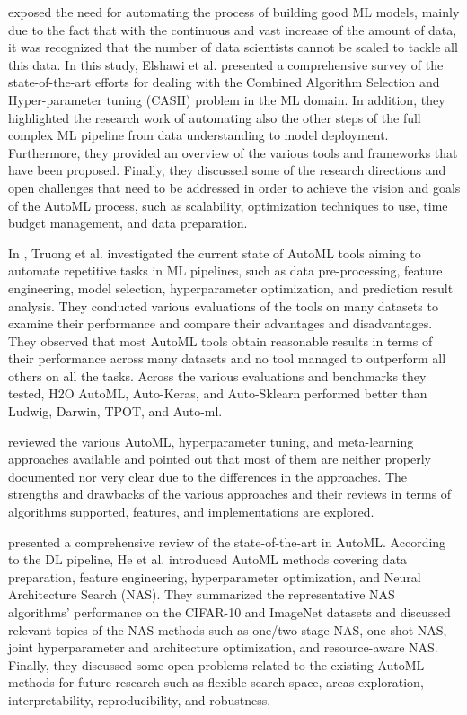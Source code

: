 \cite{Elshawi2019} exposed the need for automating the process of building good ML models, mainly due to the fact that with the continuous and vast increase of the amount of data, it was recognized that the number of data scientists cannot be scaled to tackle all this data.
In this study, Elshawi et al. presented a comprehensive survey of the state-of-the-art efforts for dealing with the Combined Algorithm Selection and Hyper-parameter tuning (CASH) problem in the ML domain.
In addition, they highlighted the research work of automating also the other steps of the full complex ML pipeline from data understanding to model deployment.
Furthermore, they provided an overview of the various tools and frameworks that have been proposed.
Finally, they discussed some of the research directions and open challenges that need to be addressed in order to achieve the vision and goals of the AutoML process, such as scalability, optimization techniques to use, time budget management, and data preparation.

In \cite{8995391}, Truong et al. investigated the current state of AutoML tools aiming to automate repetitive tasks in ML pipelines, such as data pre-processing, feature engineering, model selection, hyperparameter optimization, and prediction result analysis.
They conducted various evaluations of the tools on many datasets to examine their performance and compare their advantages and disadvantages.
They observed that most AutoML tools obtain reasonable results in terms of their performance across many datasets and no tool managed to outperform all others on all the tasks.
Across the various evaluations and benchmarks they tested, H2O AutoML, Auto-Keras, and Auto-Sklearn performed better than Ludwig, Darwin, TPOT, and Auto-ml.

\cite{9033810} reviewed the various AutoML, hyperparameter tuning, and meta-learning approaches available and pointed out that most of them are neither properly documented nor very clear due to the differences in the approaches.
The strengths and drawbacks of the various approaches and their reviews in terms of algorithms supported, features, and implementations are explored.

\cite{HE2021106622} presented a comprehensive review of the state-of-the-art in AutoML.
According to the DL pipeline, He et al. introduced AutoML methods covering data preparation, feature engineering, hyperparameter optimization, and Neural Architecture Search (NAS).
They summarized the representative NAS algorithms’ performance on the CIFAR-10 and ImageNet datasets and discussed relevant topics of the NAS methods such as one\slash two-stage NAS, one-shot NAS, joint hyperparameter and architecture optimization, and resource-aware NAS.
Finally, they discussed some open problems related to the existing AutoML methods for future research such as flexible search space, areas exploration, interpretability, reproducibility, and robustness.

